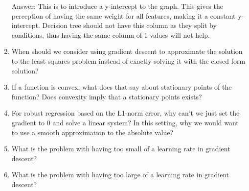 \documentclass{article}
\def\ans#1{\par\gre{Answer: #1}}
\def\gre#1{{\color{gre}#1}}
\begin{document}
\begin{enumerate}
\ans{This is to introduce a y-intercept to the graph. This gives the perception of having the same weight for all features, making it a constant y-intercept. Decision tree should not have this column as they split by conditions, thus having the same column of 1 values will not help.}
\item When should we consider using gradient descent to approximate the solution to the least squares problem instead of exactly solving it with the closed form solution?
\item If a function is convex, what does that say about stationary points of the function? Does convexity imply that a stationary points exists?
\item For robust regression based on the L1-norm error, why can't we just set the gradient to 0 and solve a linear system? In this setting, why we would want to use a smooth approximation to the absolute value?
\item What is the problem with having too small of a learning rate in gradient descent?
\item What is the problem with having too large of a learning rate in gradient descent?
\end{enumerate}
\end{document}
